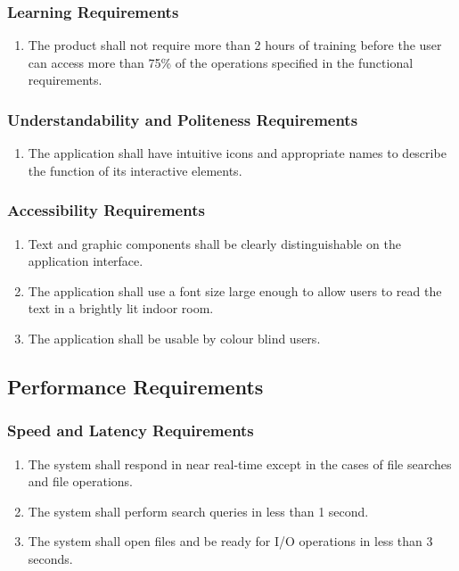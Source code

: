 \documentclass{article}
\begin{document}
\subsubsection{Learning Requirements}
\begin{enumerate}[LER1]
    \item The product shall not require more than 2 hours of training before the user can access more than 75\% of the operations specified in the functional requirements.
\end{enumerate}

\subsubsection{Understandability and Politeness Requirements}
\begin{enumerate}[UPR1]
    \item The application shall have intuitive icons and appropriate names to describe the function of its interactive elements.
\end{enumerate}

\subsubsection{Accessibility Requirements}
\begin{enumerate}[{A}CR1]
    \item Text and graphic components shall be clearly distinguishable on the application interface.
    \item The application shall use a font size large enough to allow users to read the text in a brightly lit indoor room.
    \item The application shall be usable by colour blind users.
\end{enumerate}

\subsection{Performance Requirements}
\subsubsection{Speed and Latency Requirements}
\begin{enumerate}[SLR1]
    \item The system shall respond in near real-time except in the cases of file searches and file operations.
    \item The system shall perform search queries in less than 1 second.
    \item The system shall open files and be ready for I/O operations in less than 3 seconds.
\end{enumerate}
\end{document}
